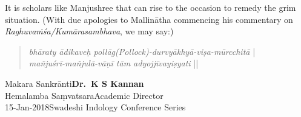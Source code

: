 It is scholars like Manjushree that can rise to the occasion to remedy the grim situation. (With due apologies to Mallinātha commencing his commentary on {\sl Raghuvaṁśa/Kumārasambhava}, we may say:)
\begin{quote}
{{\sl bhāraty ādikaveḥ pollāg(Pollock)-durvyākhyā-viṣa-mūrcchitā}} |\\
{\sl mañjuśrī-mañjulā-vāṇī tām adyojjīvayiṣyati} ||
\end{quote}


\noindent
Makara Sankrānti\hfill	{\bf Dr.~K S Kannan}\\
Hemalamba Saṃvatsara\hfill Academic Director\\
15-Jan-2018\hfill Swadeshi Indology Conference Series


